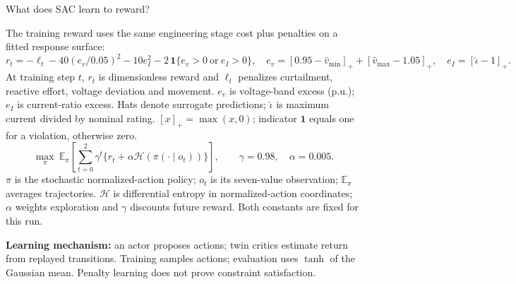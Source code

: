 \begin{frame}[t]{What does SAC learn to reward?}

\footnotesize
The training reward uses the same engineering stage cost plus penalties on a fitted response surface:
\[
r_t=-\ell_t-40(e_v/0.05)^2-10e_I^2-2\,\mathbf1\{e_v>0\ \text{or}\ e_I>0\},
\quad e_v=[0.95-\widehat v_{\min}]_++[\widehat v_{\max}-1.05]_+,\quad e_I=[\widehat\iota-1]_+.
\]
At training step $t$, $r_t$ is dimensionless reward and $\ell_t$ penalizes curtailment, reactive effort, voltage deviation and movement. $e_v$ is voltage-band excess (p.u.); $e_I$ is current-ratio excess. Hats denote surrogate predictions; $\widehat\iota$ is maximum current divided by nominal rating. $[x]_+=\max(x,0)$; indicator $\mathbf1$ equals one for a violation, otherwise zero.
\[
\max_\pi\ \mathbb E_\pi\!\left[\sum_{t=0}^{2}\gamma^t\{r_t+\alpha\mathcal H(\pi(\cdot\mid o_t))\}\right],
\qquad \gamma=0.98,\quad\alpha=0.005.
\]
$\pi$ is the stochastic normalized-action policy; $o_t$ is its seven-value observation; $\mathbb E_\pi$ averages trajectories. $\mathcal H$ is differential entropy in normalized-action coordinates; $\alpha$ weights exploration and $\gamma$ discounts future reward. Both constants are fixed for this run.
\smallskip\par\small
\textbf{Learning mechanism:} an actor proposes actions; twin critics estimate return from replayed transitions. Training samples actions; evaluation uses $\tanh$ of the Gaussian mean. Penalty learning does not prove constraint satisfaction.
\end{frame}

